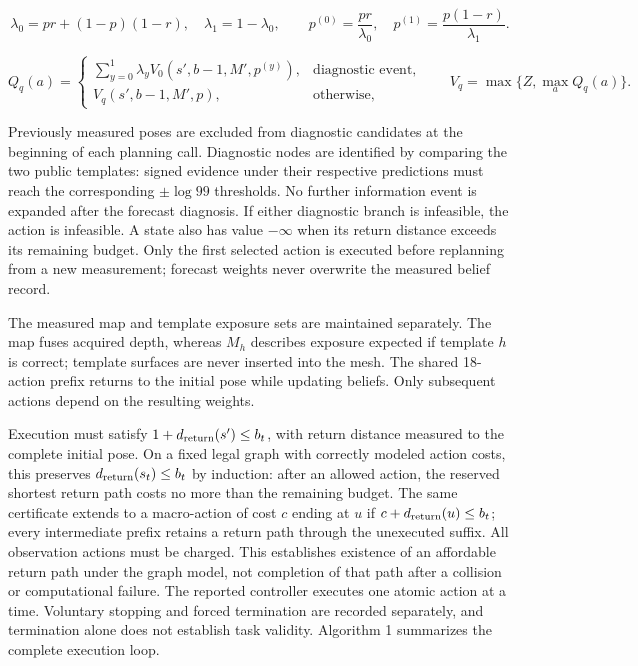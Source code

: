 \documentclass[11pt,a4paper]{article}
\begin{document}
\[
\lambda_0=pr+(1-p)(1-r),\quad \lambda_1=1-\lambda_0,
\qquad p^{(0)}=\frac{pr}{\lambda_0},\quad
p^{(1)}=\frac{p(1-r)}{\lambda_1}.
\]

\[
Q_q(a)=
\begin{cases}
\sum_{y=0}^{1}\lambda_y V_0(s',b-1,M',p^{(y)}),&\text{diagnostic event},\\
V_q(s',b-1,M',p),&\text{otherwise},
\end{cases}
\qquad V_q=\max\{Z,\max_a Q_q(a)\}.
\]

Previously measured poses are excluded from diagnostic candidates at the beginning of each planning call. Diagnostic nodes are identified by comparing the two public templates: signed evidence under their respective predictions must reach the corresponding \(\pm\log99\) thresholds. No further information event is expanded after the forecast diagnosis. If either diagnostic branch is infeasible, the action is infeasible. A state also has value \(-\infty\) when its return distance exceeds its remaining budget. Only the first selected action is executed before replanning from a new measurement; forecast weights never overwrite the measured belief record.

The measured map and template exposure sets are maintained separately. The map fuses acquired depth, whereas \(M_h\) describes exposure expected if template \(h\) is correct; template surfaces are never inserted into the mesh. The shared 18-action prefix returns to the initial pose while updating beliefs. Only subsequent actions depend on the resulting weights.

Execution must satisfy \(1+d_{\rm return}(s')\le b_t\), with return distance measured to the complete initial pose. On a fixed legal graph with correctly modeled action costs, this preserves \(d_{\rm return}(s_t)\le b_t\) by induction: after an allowed action, the reserved shortest return path costs no more than the remaining budget. The same certificate extends to a macro-action of cost \(c\) ending at \(u\) if \(c+d_{\rm return}(u)\le b_t\); every intermediate prefix retains a return path through the unexecuted suffix. All observation actions must be charged. This establishes existence of an affordable return path under the graph model, not completion of that path after a collision or computational failure. The reported controller executes one atomic action at a time. Voluntary stopping and forced termination are recorded separately, and termination alone does not establish task validity. Algorithm 1 summarizes the complete execution loop.
\end{document}
